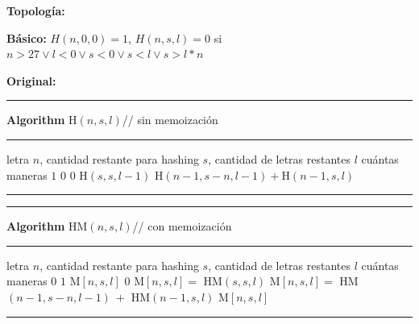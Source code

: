 \documentclass[a4paper, 12pt]{article}
\begin{document}
\textbf{Topología: }\\[-5mm]
\strut\hfill

\hfill\strut\par

\textbf{Básico:} $H(n, 0, 0)=1$, $H(n,s,l)=0$ si $n > 27 \lor l< 0 \lor s < 0 \lor s < l \lor s > l * n$

\textbf{Original:}\\
\begin{minipage}[t]{78mm}
  \hrule{\bf Algorithm} H$(n,s,l)$\hfill// sin memoización\hrule
  \begin{algorithmic}[1]
    \mInput letra $n$, cantidad restante para hashing $s$, cantidad de letras restantes $l$
    \mOutput cuántas maneras
    \Return $1$
    \EndIf
    \Return $0$
    \EndIf
    \Return $0$
    \EndIf
    \Return H$(s,s,l-1)$
    \Else
    \Return H$(n-1,s-n,l-1)+$H$(n-1,s,l)$
    \EndIf
  \end{algorithmic}\hrule
\end{minipage}\hfill\begin{minipage}[t]{88mm}
  \hrule{\bf Algorithm} HM$(n,s,l)$\hfill// con memoización\hrule
  \begin{algorithmic}[1]
    \mInput letra $n$, cantidad restante para hashing $s$, cantidad de letras restantes $l$
    \mOutput cuántas maneras
    \Return $0$
    \EndIf
    \Return $1$
    \EndIf
    \Return M$[n,s,l]$
    \EndIf
    \Return $0$
    \EndIf
    \State M$[n,s,l]=$ HM$(s,s,l)$
    \Else
    \State M$[n,s,l]=$ HM$(n-1,s-n,l-1)\ +$ HM$(n-1,s,l)$
    \EndIf
    \Return M$[n,s,l]$
  \end{algorithmic}\hrule
\end{minipage}
\end{document}
